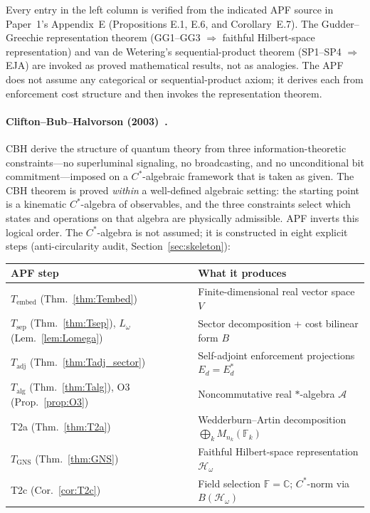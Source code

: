\documentclass[11pt,a4paper]{article}
\theoremstyle{definition}
\begin{document}
\noindent Every entry in the left column is verified from the indicated APF source in Paper~1's Appendix~E (Propositions E.1, E.6, and Corollary~E.7).  The Gudder--Greechie representation theorem (GG1--GG3 $\Rightarrow$ faithful Hilbert-space representation) and van de Wetering's sequential-product theorem (SP1--SP4 $\Rightarrow$ EJA) are invoked as proved mathematical results, not as analogies.  The APF does not assume any categorical or sequential-product axiom; it derives each from enforcement cost structure and then invokes the representation theorem.

\paragraph{Clifton--Bub--Halvorson (2003)~\cite{CBH2003}.}
CBH derive the structure of quantum theory from three information-theoretic constraints---no superluminal signaling, no broadcasting, and no unconditional bit commitment---imposed on a $C^*$-algebraic framework that is taken as given.  The CBH theorem is proved \emph{within} a well-defined algebraic setting: the starting point is a kinematic $C^*$-algebra of observables, and the three constraints select which states and operations on that algebra are physically admissible.  APF inverts this logical order.  The $C^*$-algebra is not assumed; it is constructed in eight explicit steps (anti-circularity audit, Section~\ref{sec:skeleton}):

\smallskip
\begin{center}\small
\begin{tabular}{@{}ll@{}}
\textbf{APF step} & \textbf{What it produces} \\
\midrule
$T_{\mathrm{embed}}$ (Thm.~\ref{thm:Tembed}) & Finite-dimensional real vector space $V$ \\
$T_{\mathrm{sep}}$ (Thm.~\ref{thm:Tsep}), $L_\omega$ (Lem.~\ref{lem:Lomega}) & Sector decomposition + cost bilinear form $B$ \\
$T_{\mathrm{adj}}$ (Thm.~\ref{thm:Tadj_sector}) & Self-adjoint enforcement projections $E_d = E_d^*$ \\
$T_{\mathrm{alg}}$ (Thm.~\ref{thm:Talg}), O3 (Prop.~\ref{prop:O3}) & Noncommutative real $*$-algebra $\mathcal{A}$ \\
T2a (Thm.~\ref{thm:T2a}) & Wedderburn--Artin decomposition $\bigoplus_k M_{n_k}(\mathbb{F}_k)$ \\
$T_{\mathrm{GNS}}$ (Thm.~\ref{thm:GNS}) & Faithful Hilbert-space representation $\mathcal{H}_\omega$ \\
T2c (Cor.~\ref{cor:T2c}) & Field selection $\mathbb{F} = \mathbb{C}$; $C^*$-norm via $B(\mathcal{H}_\omega)$ \\
\end{tabular}
\end{center}
\end{document}
